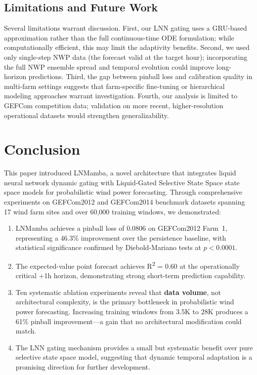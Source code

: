 \documentclass[review]{elsarticle}
\begin{document}
\subsection{Limitations and Future Work}

Several limitations warrant discussion. First, our LNN gating uses a GRU-based approximation rather than the full continuous-time ODE formulation; while computationally efficient, this may limit the adaptivity benefits. Second, we used only single-step NWP data (the forecast valid at the target hour); incorporating the full NWP ensemble spread and temporal evolution could improve long-horizon predictions. Third, the gap between pinball loss and calibration quality in multi-farm settings suggests that farm-specific fine-tuning or hierarchical modeling approaches warrant investigation. Fourth, our analysis is limited to GEFCom competition data; validation on more recent, higher-resolution operational datasets would strengthen generalizability.

\section{Conclusion}

This paper introduced LNMamba, a novel architecture that integrates liquid neural network dynamic gating with Liquid-Gated Selective State Space state space models for probabilistic wind power forecasting. Through comprehensive experiments on GEFCom2012 and GEFCom2014 benchmark datasets spanning 17 wind farm sites and over 60,000 training windows, we demonstrated:

\begin{enumerate}
    \item LNMamba achieves a pinball loss of 0.0806 on GEFCom2012 Farm~1, representing a 46.3\% improvement over the persistence baseline, with statistical significance confirmed by Diebold-Mariano tests at $p < 0.0001$.
    \item The expected-value point forecast achieves R\textsuperscript{2} = 0.60 at the operationally critical +1h horizon, demonstrating strong short-term prediction capability.
    \item Ten systematic ablation experiments reveal that \textbf{data volume}, not architectural complexity, is the primary bottleneck in probabilistic wind power forecasting. Increasing training windows from 3.5K to 28K produces a 61\% pinball improvement---a gain that no architectural modification could match.
    \item The LNN gating mechanism provides a small but systematic benefit over pure selective state space model, suggesting that dynamic temporal adaptation is a promising direction for further development.
\end{enumerate}
\end{document}
